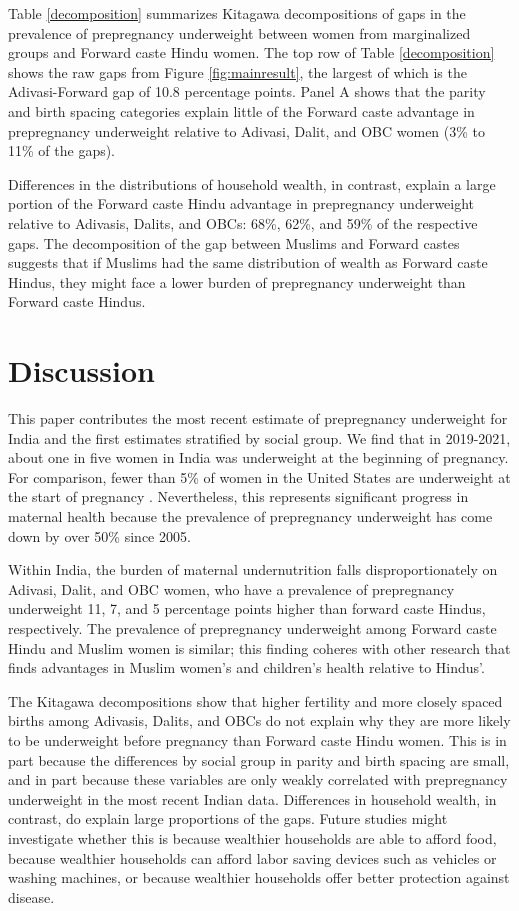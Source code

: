 \documentclass[12pt]{article}
\begin{document}
Table \ref{decomposition} summarizes Kitagawa decompositions of gaps in the prevalence of prepregnancy underweight between women from marginalized groups and Forward caste Hindu women.  The top row of Table \ref{decomposition} shows the raw gaps from Figure \ref{fig:mainresult}, the largest of which is the Adivasi-Forward gap of 10.8 percentage points.  Panel A shows that the parity and birth spacing categories explain little of the Forward caste advantage in prepregnancy underweight relative to Adivasi, Dalit, and OBC women (3\% to 11\% of the gaps). 

Differences in the distributions of household wealth, in contrast, explain a large portion of the Forward caste Hindu advantage in prepregnancy underweight relative to Adivasis, Dalits, and OBCs: 68\%, 62\%, and 59\% of the respective gaps.  The decomposition of the gap between Muslims and Forward castes suggests that if Muslims had the same distribution of wealth as Forward caste Hindus, they might face a lower burden of prepregnancy underweight than Forward caste Hindus. 

\section{Discussion}

This paper contributes the most recent estimate of prepregnancy underweight for India and the first estimates stratified by social group. We find that in 2019-2021, about one in five women in India was underweight at the beginning of pregnancy. For comparison, fewer than 5\% of women in the United States are underweight at the start of pregnancy \citep{zong2022maternal}.  Nevertheless, this represents significant progress in maternal health because the prevalence of prepregnancy underweight has come down by over 50\% since 2005.  

Within India, the burden of maternal undernutrition falls disproportionately on Adivasi, Dalit, and OBC women, who have a prevalence of prepregnancy underweight 11, 7, and 5 percentage points higher than forward caste Hindus, respectively.  The prevalence of prepregnancy underweight among Forward caste Hindu and Muslim women is similar; this finding coheres with other research that finds advantages in Muslim women's and children's health relative to Hindus'.   

The Kitagawa decompositions show that higher fertility and more closely spaced births among Adivasis, Dalits, and OBCs do not explain why they are more likely to be underweight before pregnancy than Forward caste Hindu women.  This is in part because the differences by social group in parity and birth spacing are small, and in part because these variables are only weakly correlated with prepregnancy underweight in the most recent Indian data. Differences in household wealth, in contrast, do explain large proportions of the gaps.  Future studies might investigate whether this is because wealthier households are able to afford food, because wealthier households can afford labor saving devices such as vehicles or washing machines, or because wealthier households offer better protection against disease. 
\end{document}
